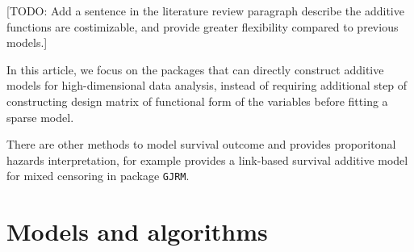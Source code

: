 \documentclass[
]{jss}
\begin{document}
{[}TODO: Add a sentence in the literature review paragraph describe the
additive functions are costimizable, and provide greater flexibility
compared to previous models.{]}

In this article, we focus on the packages that can directly construct
additive models for high-dimensional data analysis, instead of requiring
additional step of constructing design matrix of functional form of the
variables before fitting a sparse model.

There are other methods to model survival outcome and provides
proporitonal hazards interpretation, for example \cite{Marra2021}
provides a link-based survival additive model for mixed censoring in
package \texttt{GJRM}.

\section{Models and algorithms}
\end{document}
